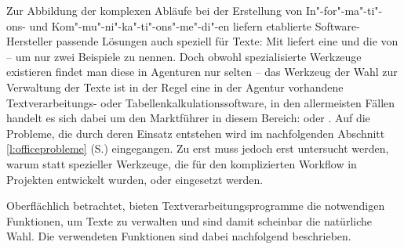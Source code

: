 Zur Abbildung der komplexen Abläufe bei der Erstellung von In"-for"-ma"-ti"-ons- und Kom"-mu"-ni"-ka"-ti"-ons"-me"-di"-en liefern etablierte Software-Hersteller passende Lösungen auch speziell für Texte: Mit  liefert  eine  \cite{adobeincopy} und  die  von   \cite{woodwing} -- um nur zwei Beispiele zu nennen. Doch obwohl spezialisierte Werkzeuge existieren findet man diese in Agenturen nur selten -- das Werkzeug der Wahl zur Verwaltung der Texte ist in der Regel eine in der Agentur vorhandene Textverarbeitungs- oder Tabellenkalkulationssoftware, in den allermeisten Fällen handelt es sich dabei um den Marktführer in diesem Bereich:   oder . Auf die Probleme, die durch deren Einsatz entstehen wird im nachfolgenden Abschnitt \ref{l:officeprobleme} (S.\pageref{l:officeprobleme}) eingegangen. Zu erst muss jedoch erst untersucht werden, warum statt spezieller Werkzeuge, die für den komplizierten Workflow in Projekten entwickelt wurden,  oder  eingesetzt werden.

\bigskip

Oberflächlich betrachtet, bieten Textverarbeitungsprogramme die notwendigen Funktionen, um Texte zu verwalten und sind damit scheinbar die natürliche Wahl. Die verwendeten Funktionen sind dabei nachfolgend beschrieben.

